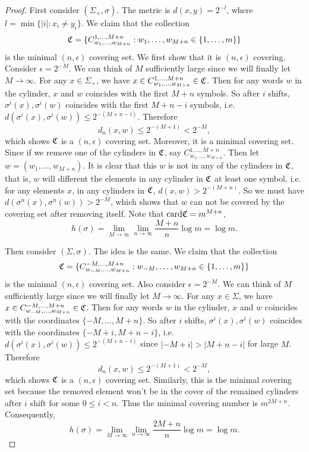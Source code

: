 \documentclass[12pt,a4paper]{article}
\begin{document}
	\begin{proof} 
		First consider $(\Sigma_+,\sigma)$. The metric is $d(x,y)=2^{-l}$, where $l=\min\{|i|:x_i\neq y_i\}$. We claim that the collection
		$$
		\mathfrak{C} = \{C_{w_1,\dots,w_{M+n}}^{1,\dots,M+n}: w_1,\dots,w_{M+n}\in\{1,\dots,m\}\}
		$$
		is the minimal $(n,\epsilon)$ covering set. We first show that it is $(n,\epsilon)$ covering. Consider $\epsilon=2^{-M}$. We can think of $M$ sufficiently large since we will finally let $M\to \infty$. For any $x\in\Sigma_+$, we have $x\in C_{w_1,\dots,w_{M+n}}^{1,\dots,M+n}\in \mathfrak{C}$. Then for any words $w$ in the cylinder, $x$ and $w$ coincides with the first $M+n$ symbols. So after $i$ shifts, $\sigma^i(x),\sigma^i(w) $ coincides with the first $M+n-i$ symbols, i.e. $d(\sigma^i(x),\sigma^i(w))\leq 2^{-(M+n-i)}$. Therefore
		$$
		d_n(x,w)\leq 2^{-(M+1)}<2^{-M},
		$$
		which shows $\mathfrak{C}$ is a $(n,\epsilon)$ covering set. Moreover, it is a minimal covering set. Since if we remove one of the cylinders in $\mathfrak{C}$, say $C_{w_1,\dots,w_{M+n}}^{1,\dots,M+n}$. Then let $w=(w_1,\dots,w_{M+n})$. It is clear that this $w$ is not in any of the cylinders in $\mathfrak{C}$, that is, $w$ will different the elements in any cylinder in $\mathfrak{C}$ at least one symbol, i.e. for any elements $x$, in any cylinders in $\mathfrak{C}$, $d(x,w)>2^{-(M+n)}$. So we must have $d(\sigma^n(x),\sigma^n(w))>2^{-M}$, which shows that $w$ can not be covered by the covering set after removing itself.	Note that $\text{card} \mathfrak{C}=m^{M+n}$,
		$$
		h(\sigma) = \lim_{M\to \infty}\lim_{n\to\infty}\frac{M+n}{n}\log m = \log m.
		$$
		
		Then consider $(\Sigma,\sigma)$. The idea is the same. We claim that the collection
		$$
		\mathfrak{C} = \{C_{w_{-M},\dots,w_{M+n}}^{-M,\dots,M+n}: w_{-M},\dots,w_{M+n}\in\{1,\dots,m\}\}
		$$
		is the minimal $(n,\epsilon)$ covering set. Also consider $\epsilon=2^{-M}$. We can think of $M$ sufficiently large since we will finally let $M\to \infty$. For any $x\in \Sigma$, we have $x\in C_{w_{-M},\dots,w_{M+n}}^{-M,\dots,M+n}\in \mathfrak{C}$. Then for any words $w$ in the cylinder, $x$ and $w$ coincides with the coordinates $\{-M,\dots, M+n\}$. So after $i$ shifts, $\sigma^i(x),\sigma^i(w) $ coincides with the coordinates $\{-M+i, M+n-i\}$, i.e. $d(\sigma^i(x),\sigma^i(w))\leq 2^{-(M+n-i)}$ since $|-M+i|>|M+n-i|$ for large $M$. Therefore
		$$
		d_n(x,w)\leq 2^{-(M+1)}<2^{-M},
		$$
		which shows $\mathfrak{C}$ is a $(n,\epsilon)$ covering set. Similarly, this is the minimal covering set because the removed element won't be in the cover of the remained cylinders after $i$ shift for some $0\leq i<n$. Thus the minimal covering number is $m^{2M+n}$. Consequently,
		$$
		h(\sigma) = \lim_{M\to\infty}\lim_{n\to\infty}\frac{2M+n}{n}\log m =\log m.
		$$
	\end{proof}
	
\end{document}
